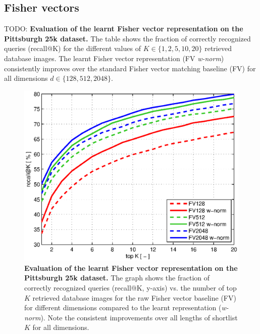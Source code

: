  \subsection{Fisher vectors}
  \label{sec:fisher_restuls}
  
    \begin{table}[tbp]
      \begin{centering}
        
        \caption{ 
          \textcolor{petr}{ TODO:
            \textbf{Evaluation of the learnt Fisher vector representation on the Pittsburgh 25k \cite{Gronat13} dataset.}
            The table shows the fraction of correctly recognized queries (recall@K) for the different values of $K\in\{1,2,5,10,20\}$ retrieved database images. The learnt Fisher vector representation (FV \emph{w-norm}) consistently improves over the standard Fisher vector matching baseline (FV) for all dimensions $d\in\{128,512,2048\}$.
          }
        }
        \label{tab:recallFV}
      \end{centering}
    \end{table}

    \begin{figure}[tbp]
        \centering
        \includegraphics[width=1\linewidth]{imgs/plotPitt25kNoBOW}  
        \vspace*{-7mm}
        \caption{
            \textbf{Evaluation of the learnt Fisher vector representation on the Pittsburgh 25k \cite{Gronat13} dataset.} 
            The graph shows the fraction of correctly recognized queries (recall@K, y-axis) vs. the number of top $K$ retrieved database images for the raw Fisher vector baseline (FV) for different dimensions compared to the learnt representation (\emph{w-norm}). Note the consistent improvements over all lengths of shortlist $K$ for all dimensions.
        }
        \label{fig:recall}
    \end{figure}

